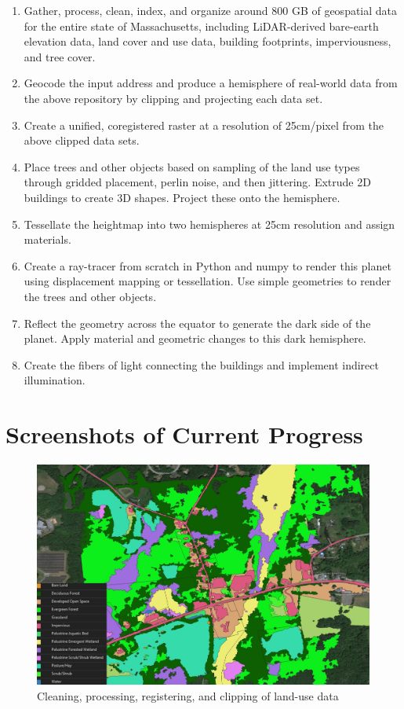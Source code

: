 \documentclass{article}
\begin{document}
\begin{enumerate}

      \item Gather, process, clean, index, and organize around 800 GB of geospatial data for the entire state of Massachusetts, including LiDAR-derived bare-earth elevation data, land cover and use data, building footprints, imperviousness, and tree cover.
      \item Geocode the input address and produce a hemisphere of real-world data from the above repository by clipping and projecting each data set.
      \item Create a unified, coregistered raster at a resolution of 25cm/pixel from the above clipped data sets.
      \item Place trees and other objects based on sampling of the land use types through gridded placement, perlin noise, and then jittering. Extrude 2D buildings to create 3D shapes. Project these onto the hemisphere.
      \item Tessellate the heightmap into two hemispheres at 25cm resolution and assign materials.
      \item Create a ray-tracer from scratch in Python and numpy to render this planet using displacement mapping or tessellation. Use simple geometries to render the trees and other objects.
      \item Reflect the geometry across the equator to generate the dark side of the planet. Apply material and geometric changes to this dark hemisphere.
      \item Create the fibers of light connecting the buildings and implement indirect illumination.

\end{enumerate}


\section{Screenshots of Current Progress}

\begin{figure}[H]
      \caption{Cleaning, processing, registering, and clipping of land-use data}
      \begin{center}
            \includegraphics[width=4.5in]{landcover.jpg}
      \end{center}
\end{figure}
\end{document}
